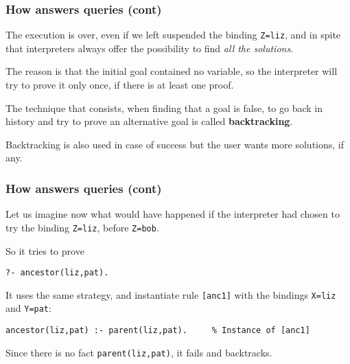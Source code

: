 %
\begin{frame}
\frametitle{How \Prolog answers queries (cont)}

The execution is over, even if we left suspended the binding
\texttt{Z=liz}, and in spite that \Prolog interpreters always offer
the possibility to find \emph{all the solutions}.

\bigskip

The reason is that the initial goal contained no variable, so the
interpreter will try to prove it only once, if there is at least one
proof.

\bigskip

The technique that consists, when finding that a goal is false, to go
back in history and try to prove an alternative goal is called
\textbf{backtracking}.

\bigskip

Backtracking is also used in case of success but the user wants more
solutions, if any.

\end{frame}

%
\begin{frame}[containsverbatim]
\frametitle{How \Prolog answers queries (cont)}

Let us imagine now what would have happened if the interpreter had
chosen to try the binding \texttt{Z=liz}, before \texttt{Z=bob}.

\bigskip

So it tries to prove
{\small
\begin{verbatim}
?- ancestor(liz,pat).
\end{verbatim}
}
It uses the same strategy, and instantiate rule \texttt{[anc1]} with
the bindings \texttt{X=liz} and \texttt{Y=pat}:
{\small
\begin{verbatim}
ancestor(liz,pat) :- parent(liz,pat).     % Instance of [anc1]
\end{verbatim}
}
Since there is no fact \texttt{parent(liz,pat)}, it fails and
backtracks.

\end{frame}

